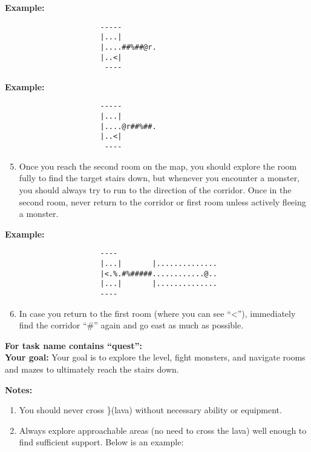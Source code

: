 \begin{MyGreenBox}
	\textbf{Example:}
	\begin{verbatim}
                      -----
                      |...|
                      |....##%##@r.
                      |..<|
                       ----
\end{verbatim}

	\textbf{Example:}
	\begin{verbatim}
                      -----
                      |...|
                      |....@r##%##.
                      |..<|
                       ----
\end{verbatim}

	\begin{enumerate}
		\setcounter{enumi}{4}

		\item Once you reach the second room on the map, you should explore the room
			fully to find the target stairs down, but whenever you encounter a monster,
			you should always try to run to the direction of the corridor. Once in the
			second room, never return to the corridor or first room unless actively
			fleeing a monster.
	\end{enumerate}

	\textbf{Example:} \begin{verbatim}
                      ----
                      |...|       |..............
                      |<.%.#%#####............@..
                      |...|       |..............
                      ----
\end{verbatim}

	\begin{enumerate}
		\setcounter{enumi}{5}

		\item In case you return to the first room (where you can see “<”),
			immediately find the corridor “\#” again and go east as much as possible.
	\end{enumerate}

	\textbf{For task name contains “quest”:}\\ \textbf{Your goal:} Your goal is to
	explore the level, fight monsters, and navigate rooms and mazes to ultimately
	reach the stairs down.

	\textbf{Notes:}
	\begin{enumerate}
		\item You should never cross \}(lava) without necessary ability or equipment.

		\item Always explore approachable areas (no need to cross the lava) well enough
			to find sufficient support. Below is an example:
	\end{enumerate}


\end{MyGreenBox}
